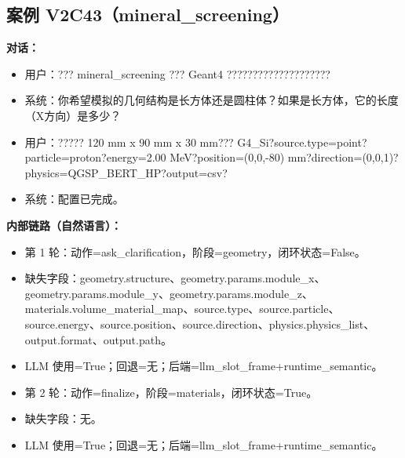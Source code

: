 \documentclass[11pt]{ctexart}
\begin{document}
\subsection{案例 V2C43（mineral\_screening）}
\textbf{对话：}
\begin{itemize}
\item 用户：??? mineral\_screening ??? Geant4 ????????????????????
\item 系统：你希望模拟的几何结构是长方体还是圆柱体？如果是长方体，它的长度（X方向）是多少？
\item 用户：????? 120 mm x 90 mm x 30 mm??? G4\_Si?source.type=point?particle=proton?energy=2.00 MeV?position=(0,0,-80) mm?direction=(0,0,1)?physics=QGSP\_BERT\_HP?output=csv?
\item 系统：配置已完成。
\end{itemize}
\textbf{内部链路（自然语言）：}
\begin{itemize}
\item 第 1 轮：动作=ask\_clarification，阶段=geometry，闭环状态=False。
\item 缺失字段：geometry.structure、geometry.params.module\_x、geometry.params.module\_y、geometry.params.module\_z、materials.volume\_material\_map、source.type、source.particle、source.energy、source.position、source.direction、physics.physics\_list、output.format、output.path。
\item LLM 使用=True；回退=无；后端=llm\_slot\_frame+runtime\_semantic。
\item 第 2 轮：动作=finalize，阶段=materials，闭环状态=True。
\item 缺失字段：无。
\item LLM 使用=True；回退=无；后端=llm\_slot\_frame+runtime\_semantic。
\end{itemize}
\end{document}

